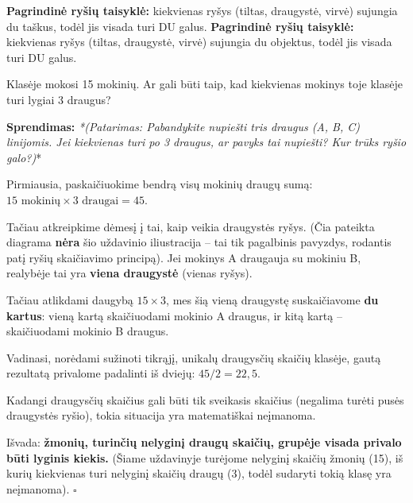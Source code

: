 \documentclass[11pt,a4paper]{scrartcl}
\newenvironment{solution}
    {\begin{list}{}{\setlength{\leftmargin}{10pt}\setlength{\rightmargin}{10pt}}\item[]}
    {\end{list}}
\begin{document}
\textbf{Pagrindinė ryšių taisyklė:} kiekvienas ryšys (tiltas, draugystė, virvė) sujungia du taškus, todėl jis visada turi DU galus.
\textbf{Pagrindinė ryšių taisyklė:} kiekvienas ryšys (tiltas, draugystė, virvė) sujungia du objektus, todėl jis visada turi DU galus.

\begin{example}
Klasėje mokosi 15 mokinių. Ar gali būti taip, kad kiekvienas mokinys toje klasėje turi lygiai 3 draugus?
\end{example}

\begin{solution}
\textbf{Sprendimas:} 
\textit{*(Patarimas: Pabandykite nupiešti tris draugus (A, B, C) linijomis. Jei kiekvienas turi po 3 draugus, ar pavyks tai nupiešti? Kur trūks ryšio galo?)}*

Pirmiausia, paskaičiuokime bendrą visų mokinių draugų sumą: $15 \text{ mokinių} \times 3 \text{ draugai} = 45$. 

Tačiau atkreipkime dėmesį į tai, kaip veikia draugystės ryšys. (Čia pateikta diagrama \textbf{nėra} šio uždavinio iliustracija – tai tik pagalbinis pavyzdys, rodantis patį ryšių skaičiavimo principą). Jei mokinys A draugauja su mokiniu B, realybėje tai yra \textbf{viena draugystė} (vienas ryšys).

\begin{center}
\end{center}

Tačiau atlikdami daugybą $15 \times 3$, mes šią vieną draugystę suskaičiavome \textbf{du kartus}: vieną kartą skaičiuodami mokinio A draugus, ir kitą kartą – skaičiuodami mokinio B draugus.

Vadinasi, norėdami sužinoti tikrąjį, unikalų draugysčių skaičių klasėje, gautą rezultatą privalome padalinti iš dviejų: $45 / 2 = 22{,}5$. 

Kadangi draugysčių skaičius gali būti tik sveikasis skaičius (negalima turėti pusės draugystės ryšio), tokia situacija yra matematiškai neįmanoma. 

Išvada: \textbf{žmonių, turinčių nelyginį draugų skaičių, grupėje visada privalo būti lyginis kiekis.} (Šiame uždavinyje turėjome nelyginį skaičių žmonių (15), iš kurių kiekvienas turi nelyginį skaičių draugų (3), todėl sudaryti tokią klasę yra neįmanoma). \hfill $\square$
\end{solution}
\end{document}
